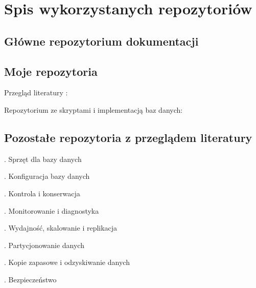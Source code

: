 \documentclass[letterpaper,10pt,english]{sphinxmanual}
\begin{document}
\sphinxstepscope


\chapter{Spis wykorzystanych repozytoriów}
\label{\detokenize{rozdzial5/index:spis-wykorzystanych-repozytoriow}}\label{\detokenize{rozdzial5/index::doc}}

\section{Główne repozytorium dokumentacji}
\label{\detokenize{rozdzial5/index:glowne-repozytorium-dokumentacji}}
\sphinxAtStartPar
{}


\section{Moje repozytoria}
\label{\detokenize{rozdzial5/index:moje-repozytoria}}
\sphinxAtStartPar
Przegląd literatury :

\sphinxAtStartPar
Repozytorium ze skryptami i implementacją baz danych:


\section{Pozostałe repozytoria z przeglądem literatury}
\label{\detokenize{rozdzial5/index:pozostale-repozytoria-z-przegladem-literatury}}
. Sprzęt dla bazy danych

. Konfiguracja bazy danych

. Kontrola i konserwacja

. Monitorowanie i diagnostyka

. Wydajność, skalowanie i replikacja

. Partycjonowanie danych

. Kopie zapasowe i odzyskiwanie danych

. Bezpieczeństwo



\renewcommand{\indexname}{Index}
\printindex
\end{document}
